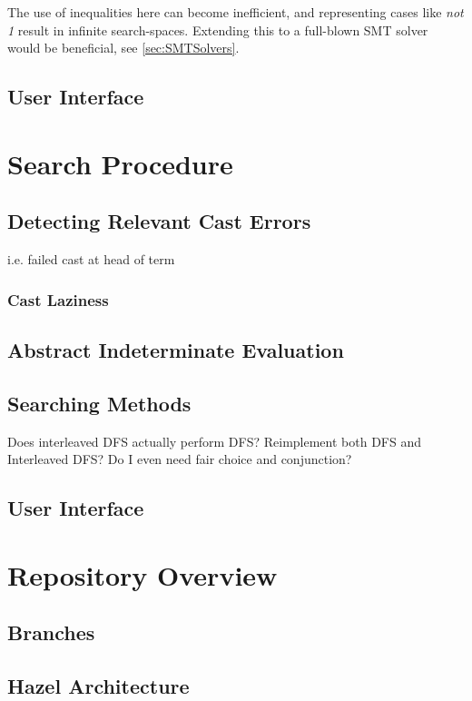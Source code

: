 The use of inequalities here can become inefficient, and representing cases like \textit{not 1} result in infinite search-spaces. Extending this to a full-blown SMT solver would be beneficial, see \cref{sec:SMTSolvers}.

\subsection{User Interface}\label{sec:UIIndetEval}

\section{Search Procedure}\label{sec:SearchProcedure}
\subsection{Detecting Relevant Cast Errors}
i.e. failed cast at head of term

\subsubsection{Cast Laziness}
\label{sec:SearchCastLaziness}

\subsection{Abstract Indeterminate Evaluation}


\subsection{Searching Methods}\label{sec:SearchMethods}
Does interleaved DFS actually perform DFS? Reimplement both DFS and Interleaved DFS? Do I even need fair choice and conjunction?
\subsection{User Interface}

\section{Repository Overview}
\subsection{Branches}


\subsection{Hazel Architecture}



